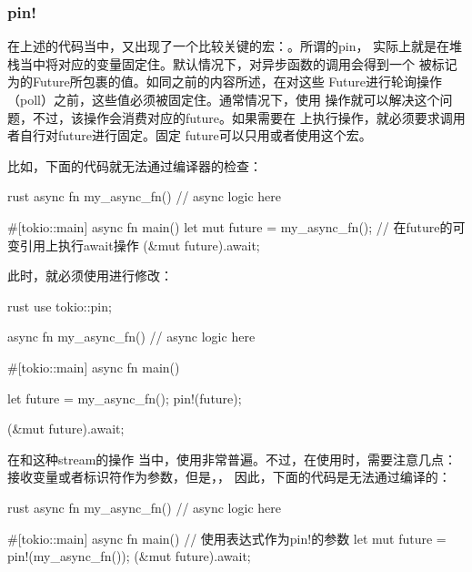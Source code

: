 \subsubsection{pin!}
在上述的代码当中，又出现了一个比较关键的宏：。所谓的pin，
实际上就是在堆栈当中将对应的变量固定住。默认情况下，对异步函数的调用会得到一个
被标记为的Future所包裹的值。如同之前的内容所述，在对这些
Future进行轮询操作（poll）之前，这些值必须被固定住。通常情况下，使用
操作就可以解决这个问题，不过，该操作会消费对应的future。如果需要在
上执行操作，就必须要求调用者自行对future进行固定。固定
future可以只用或者使用这个宏。

比如，下面的代码就无法通过编译器的检查：
\begin{code-block}{rust}
async fn my_async_fn() {
    // async logic here
}

#[tokio::main]
async fn main() {
    let mut future = my_async_fn();
    // 在future的可变引用上执行await操作
    (&mut future).await;
}
\end{code-block}

此时，就必须使用进行修改：
\begin{code-block}{rust}
use tokio::pin;

async fn my_async_fn() {
    // async logic here
}

#[tokio::main]
async fn main() {
    let future = my_async_fn();
    pin!(future);

    (&mut future).await;
}
\end{code-block}

在和这种stream的操作
当中，使用非常普遍。不过，在使用时，需要注意几点：
接收变量或者标识符作为参数，但是，，
因此，下面的代码是无法通过编译的：
\begin{code-block}{rust}
async fn my_async_fn() {
    // async logic here
}

#[tokio::main]
async fn main() {
    // 使用表达式作为pin!的参数
    let mut future = pin!(my_async_fn());
    (&mut future).await;
}
\end{code-block}


